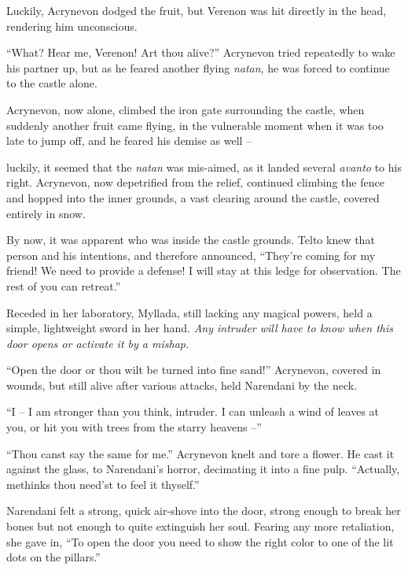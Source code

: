 Luckily, Acrynevon dodged the fruit, but Verenon was hit directly in the head, rendering him unconscious.

``What? Hear me, Verenon! Art thou alive?'' Acrynevon tried repeatedly to wake his partner up, but as he feared another flying \emph{natan}, he was forced to continue to the castle alone.

\centeredstars

Acrynevon, now alone, climbed the iron gate surrounding the castle, when suddenly another fruit came flying, in the vulnerable moment when it was too late to jump off, and he feared his demise as well --

luckily, it seemed that the \emph{natan} was mis-aimed, as it landed several \emph{avanto} to his right. Acrynevon, now depetrified from the relief, continued climbing the fence and hopped into the inner grounds, a vast clearing around the castle, covered entirely in snow.

\centeredstars

By now, it was apparent who was inside the castle grounds. Telto knew that person and his intentions, and therefore announced, ``They're coming for my friend! We need to provide a defense! I will stay at this ledge for observation. The rest of you can retreat.''

\centeredstars

Receded in her laboratory, Myllada, still lacking any magical powers, held a simple, lightweight sword in her hand. \emph{Any intruder will have to know when this door opens or activate it by a mishap.}

\centeredstars

``Open the door or thou wilt be turned into fine sand!'' Acrynevon, covered in wounds, but still alive after various attacks, held Narendani by the neck.

``I -- I am stronger than you think, intruder. I can unleash a wind of leaves at you, or hit you with trees from the starry heavens --''

``Thou canst say the same for me.'' Acrynevon knelt and tore a flower. He cast it against the glass, to Narendani's horror, decimating it into a fine pulp. ``Actually, methinks thou need'st to feel it thyself.''

Narendani felt a strong, quick air-shove into the door, strong enough to break her bones but not enough to quite extinguish her soul. Fearing any more retaliation, she gave in, ``To open the door you need to show the right color to one of the lit dots on the pillars.''

